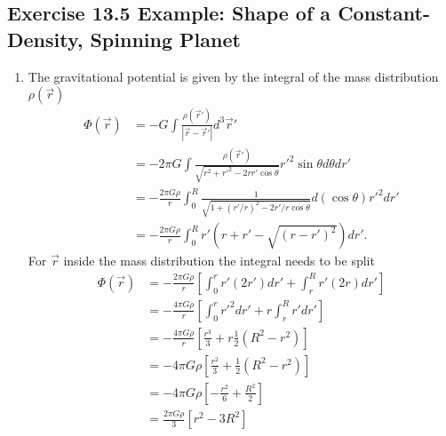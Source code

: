 \documentclass[10pt,a4paper]{book}
\theoremstyle{definition}
\begin{document}
\subsection{Exercise 13.5 Example: Shape of a Constant-Density, Spinning Planet}
\begin{enumerate}[label=(\alph*)]
\item The gravitational potential is given by the integral of the mass distribution $\rho(\vec{r})$
\begin{align}
    \Phi(\vec{r})
    &=-G\int\frac{\rho(\vec{r}')}{|\vec{r}-\vec{r}'|}d^3\vec{r}'\\
    &=-2\pi G\int\frac{\rho(\vec{r}')}{\sqrt{r^2+{r'}^2-2rr'\cos\theta}}r'^2\sin\theta d\theta dr'\\
    &=-\frac{2\pi G\rho}{r}\int_0^R\frac{1}{\sqrt{1+(r'/r)^2-2r'/r\cos\theta}}d(\cos\theta) r'^2dr'\\
    &=-\frac{2\pi G\rho}{r}\int_0^Rr'\left(r+r'-\sqrt{(r-r')^2}\right)dr'.
\end{align}
For $\vec{r}$ inside the mass distribution the integral needs to be split
\begin{align}
    \Phi(\vec{r})
    &=-\frac{2\pi G\rho}{r}\left[\int_0^rr'\left(2r'\right)dr'+\int_r^Rr'\left(2r\right)dr'\right]\\
    &=-\frac{4\pi G\rho}{r}\left[\int_0^rr'^2dr'+r\int_r^Rr'dr'\right]\\
    &=-\frac{4\pi G\rho}{r}\left[\frac{r^3}{3}+r\frac{1}{2}(R^2-r^2)\right]\\
    &=-4\pi G\rho\left[\frac{r^2}{3}+\frac{1}{2}(R^2-r^2)\right]\\
    &=-4\pi G\rho\left[-\frac{r^2}{6}+\frac{R^2}{2}\right]\\
    &=\frac{2\pi G\rho}{3}\left[r^2-3R^2\right]
\end{align}


\end{enumerate}
\end{document}
